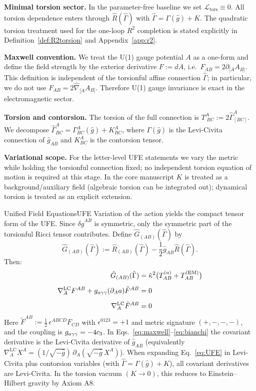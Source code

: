 \noindent\textbf{Minimal torsion sector.} In the parameter-free baseline we set $\mathcal{L}_{\mathrm{tors}}\equiv 0$.
All torsion dependence enters through $\hat{R}(\hat{\Gamma})$ with $\hat{\Gamma}=\Gamma(\hat{g})+K$.
The quadratic torsion treatment used for the one-loop $R^2$ completion is stated explicitly in Definition~\ref{def:R2torsion} and Appendix~\ref{app:r2}.

\noindent\textbf{Maxwell convention.} We treat the U(1) gauge potential $A$ as a one-form and define the field strength by the exterior derivative
$F := dA$, i.e.\ $F_{AB}=2\partial_{[A}A_{B]}$. This definition is independent of the torsionful affine connection $\hat{\Gamma}$; in particular, we do not use $F_{AB}=2\hat{\nabla}_{[A}A_{B]}$. Therefore U(1) gauge invariance is exact in the electromagnetic sector.

\noindent\textbf{Torsion and contorsion.} The torsion of the full connection is $T^A_{\;BC}:=2\hat{\Gamma}^A_{[BC]}$. We decompose
$\hat{\Gamma}^A_{BC}=\Gamma^A_{BC}(\hat{g})+K^A_{BC}$, where $\Gamma(\hat{g})$ is the Levi-Civita connection of $\hat{g}_{AB}$ and $K^A_{BC}$ is the contorsion tensor.

\noindent\textbf{Variational scope.} For the letter-level UFE statements we vary the metric while holding the torsionful connection fixed; no independent torsion equation of motion is required at this stage. In the core manuscript $K$ is treated as a background/auxiliary field (algebraic torsion can be integrated out); dynamical torsion is treated as an explicit extension.

\begin{theorem}{Unified Field Equations}{UFE}
Variation of the action yields the compact tensor form of the UFE. Since $\delta\hat{g}^{AB}$ is symmetric, only the symmetric part of the torsionful Ricci tensor contributes. Define
$\hat{G}_{(AB)}(\hat{\Gamma})$ by
\begin{equation*}
    \hat{G}_{(AB)}(\hat{\Gamma}) := \hat{R}_{(AB)}(\hat{\Gamma}) - \frac{1}{2}\hat{g}_{AB}\hat{R}(\hat{\Gamma}).
\end{equation*}
Then:
\begin{align}
    \hat{G}_{(AB)}(\hat{\Gamma})
        &= \hat{\kappa}^2\bigl(T^{(a)}_{AB} + T^{(\text{EM})}_{AB}\bigr)
        \label{eq:UFE}\\[0.5em]
    \nabla^{\mathrm{LC}}_A F^{AB} + g_{a\gamma\gamma}(\partial_A a)\tilde{F}^{AB} &= 0
        \label{eq:maxwell}\\[0.5em]
    \nabla^{\mathrm{LC}}_A\tilde{F}^{AB} &= 0
        \label{eq:bianchi}
\end{align}
Here $\tilde{F}^{AB} := \tfrac12\,\epsilon^{ABCD}F_{CD}$ with $\epsilon^{0123}=+1$ and
metric signature $(+,-,-,-)$, and the coupling is $g_{a\gamma\gamma}=-4c_3$.
In Eqs.~\eqref{eq:maxwell}--\eqref{eq:bianchi} the covariant derivative is the Levi-Civita derivative of $\hat{g}_{AB}$ (equivalently $\nabla^{\mathrm{LC}}_A X^A=(1/\sqrt{-\hat{g}})\,\partial_A(\sqrt{-\hat{g}}\,X^A)$).
When expanding Eq.~\eqref{eq:UFE} in Levi-Civita plus contorsion variables (with $\hat{\Gamma}=\Gamma(\hat{g})+K$), all covariant derivatives are Levi-Civita.
In the torsion vacuum $(K \to 0)$, this reduces to Einstein--Hilbert gravity 
by Axiom A8.
\end{theorem}

